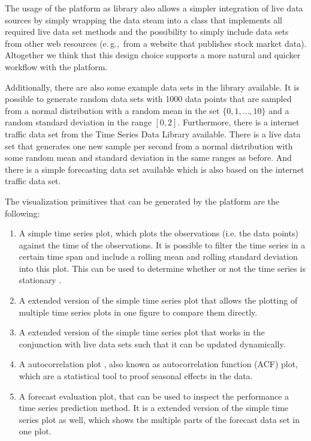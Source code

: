 \documentclass[runningheads,a4paper,11pt]{llncs}
\newcommand{\eg}{e.\,g.,\ }
\begin{document}
The usage of the platform as library also allows a simpler integration of live data sources by simply wrapping the data steam into a class that implements all required live data set methods and the possibility to simply include data sets from other web resources (\eg from a website that publishes stock market data).
Altogether we think that this design choice supports a more natural and quicker workflow with the platform.

Additionally, there are also some example data sets in the library available.
It is possible to generate random data sets with 1000 data points that are sampled from a normal distribution with a random mean in the set \(\{0,1,\ldots,10\}\) and a random standard deviation in the range \([0,2]\).
Furthermore, there is a internet traffic data set from the Time Series Data Library \cite{TSDL} available.
There is a live data set that generates one new sample per second from a normal distribution with some random mean and standard deviation in the same ranges as before.
And there is a simple forecasting data set available which is also based on the internet traffic data set.

The visualization primitives that can be generated by the platform are the following:

\begin{enumerate}
 \item A simple time series plot, which plots the observations (i.e. the data points) against the time of the observations.
 It is possible to filter the time series in a certain time span and include a rolling mean and rolling standard deviation into this plot.
 This can be used to determine whether or not the time series is stationary \cite{Nason2006}.
 
 \item A extended version of the simple time series plot that allows the plotting of multiple time series plots in one figure to compare them directly.
 
 \item A extended version of the simple time series plot that works in the conjunction with live data sets such that it can be updated dynamically. 
 
 \item A autocorrelation plot \cite{Box1976}, also known as autocorrelation function (ACF) plot, which are a statistical tool to proof seasonal effects in the data. 
 
 \item A forecast evaluation plot, that can be used to inspect the performance a time series prediction method. 
 It is a extended version of the simple time series plot as well, which shows the multiple parts of the forecast data set in one plot. 
\end{enumerate}
\end{document}
